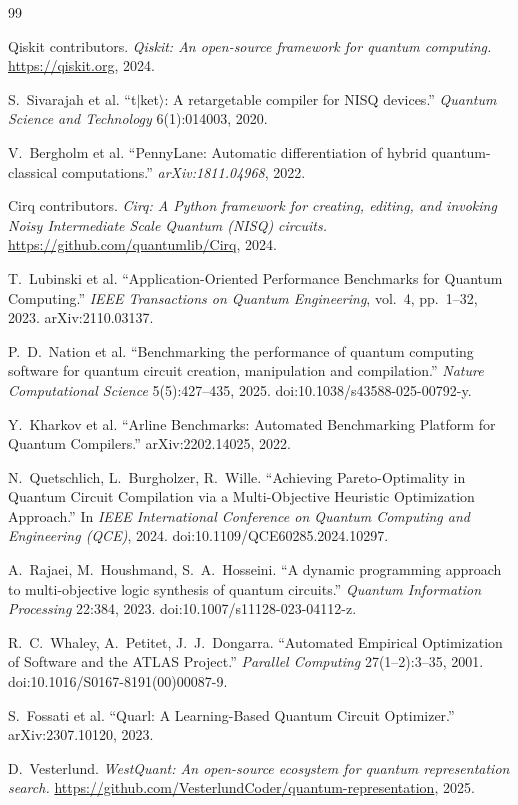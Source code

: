 \documentclass[11pt,a4paper]{article}
\begin{document}
\begin{thebibliography}{99}

 Qiskit contributors. \textit{Qiskit: An open-source framework for quantum computing.} \url{https://qiskit.org}, 2024.

 S.~Sivarajah et al. ``t$|$ket$\rangle$: A retargetable compiler for NISQ devices.'' \textit{Quantum Science and Technology} 6(1):014003, 2020.

 V.~Bergholm et al. ``PennyLane: Automatic differentiation of hybrid quantum-classical computations.'' \textit{arXiv:1811.04968}, 2022.

 Cirq contributors. \textit{Cirq: A Python framework for creating, editing, and invoking Noisy Intermediate Scale Quantum (NISQ) circuits.} \url{https://github.com/quantumlib/Cirq}, 2024.

 T.~Lubinski et al. ``Application-Oriented Performance Benchmarks for Quantum Computing.'' \textit{IEEE Transactions on Quantum Engineering}, vol.~4, pp.~1--32, 2023. arXiv:2110.03137.

 P.~D.~Nation et al. ``Benchmarking the performance of quantum computing software for quantum circuit creation, manipulation and compilation.'' \textit{Nature Computational Science} 5(5):427--435, 2025. doi:10.1038/s43588-025-00792-y.

 Y.~Kharkov et al. ``Arline Benchmarks: Automated Benchmarking Platform for Quantum Compilers.'' arXiv:2202.14025, 2022.

 N.~Quetschlich, L.~Burgholzer, R.~Wille. ``Achieving Pareto-Optimality in Quantum Circuit Compilation via a Multi-Objective Heuristic Optimization Approach.'' In \textit{IEEE International Conference on Quantum Computing and Engineering (QCE)}, 2024. doi:10.1109/QCE60285.2024.10297.

 A.~Rajaei, M.~Houshmand, S.~A.~Hosseini. ``A dynamic programming approach to multi-objective logic synthesis of quantum circuits.'' \textit{Quantum Information Processing} 22:384, 2023. doi:10.1007/s11128-023-04112-z.

 R.~C.~Whaley, A.~Petitet, J.~J.~Dongarra. ``Automated Empirical Optimization of Software and the ATLAS Project.'' \textit{Parallel Computing} 27(1--2):3--35, 2001. doi:10.1016/S0167-8191(00)00087-9.

 S.~Fossati et al. ``Quarl: A Learning-Based Quantum Circuit Optimizer.'' arXiv:2307.10120, 2023.

 D.~Vesterlund. \textit{WestQuant: An open-source ecosystem for quantum representation search.} \url{https://github.com/VesterlundCoder/quantum-representation}, 2025.

\end{thebibliography}
\end{document}
